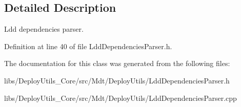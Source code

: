 \subsection{Detailed Description}
Ldd dependencies parser. 

Definition at line 40 of file Ldd\+Dependencies\+Parser.\+h.



The documentation for this class was generated from the following files\+:\begin{DoxyCompactItemize}
\item 
libs/\+Deploy\+Utils\+\_\+\+Core/src/\+Mdt/\+Deploy\+Utils/Ldd\+Dependencies\+Parser.\+h\item 
libs/\+Deploy\+Utils\+\_\+\+Core/src/\+Mdt/\+Deploy\+Utils/Ldd\+Dependencies\+Parser.\+cpp\end{DoxyCompactItemize}
